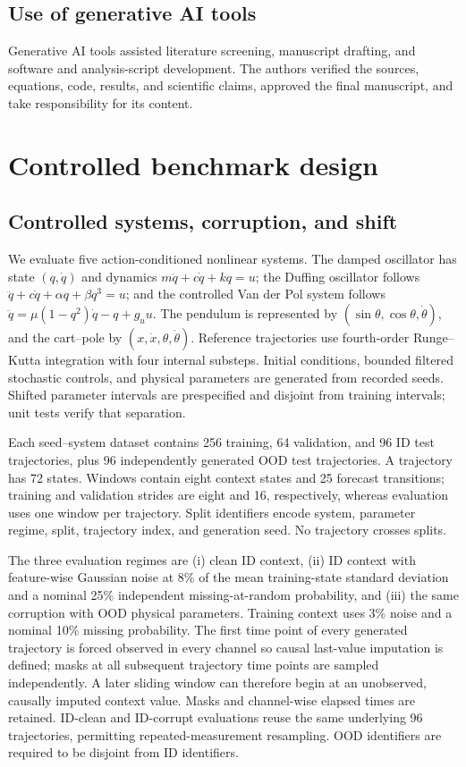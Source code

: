\documentclass[iicol,pdflatex,sn-basic,Numbered]{sn-jnl}
\begin{document}
\subsection{Use of generative AI tools}

Generative AI tools assisted literature screening, manuscript drafting, and
software and analysis-script development. The authors verified the sources,
equations, code, results, and scientific claims, approved the final manuscript,
and take responsibility for its content.

\section{Controlled benchmark design}

\subsection{Controlled systems, corruption, and shift}

We evaluate five action-conditioned nonlinear systems. The damped oscillator
has state $(q,\dot q)$ and dynamics $m\ddot q+c\dot q+kq=u$; the Duffing
oscillator follows $\ddot q+c\dot q+\alpha q+\beta q^3=u$; and the controlled
Van der Pol system follows
$\ddot q=\mu(1-q^2)\dot q-q+g_u u$. The pendulum is represented by
$(\sin\theta,\cos\theta,\dot\theta)$, and the cart--pole by
$(x,\dot x,\theta,\dot\theta)$. Reference trajectories use fourth-order
Runge--Kutta integration with four internal substeps. Initial conditions,
bounded filtered stochastic controls, and physical parameters are generated
from recorded seeds. Shifted parameter intervals are prespecified and disjoint
from training intervals; unit tests verify that separation.

Each seed--system dataset contains 256 training, 64 validation, and 96 ID test
trajectories, plus 96 independently generated OOD test trajectories. A
trajectory has 72 states. Windows contain eight context states and 25 forecast
transitions; training and validation strides are eight and 16, respectively,
whereas evaluation uses one window per trajectory. Split identifiers encode
system, parameter regime, split, trajectory index, and generation seed. No
trajectory crosses splits.

The three evaluation regimes are (i) clean ID context, (ii) ID context with
feature-wise Gaussian noise at 8\% of the mean training-state standard
deviation and a nominal 25\% independent missing-at-random probability, and
(iii) the same corruption with OOD physical parameters. Training context uses
3\% noise and a nominal 10\% missing probability. The first time point of every
generated trajectory is forced observed in every channel so causal last-value
imputation is defined; masks at all subsequent trajectory time points are
sampled independently. A later sliding window can therefore begin at an
unobserved, causally imputed context value. Masks and channel-wise elapsed times
are retained. ID-clean and ID-corrupt evaluations reuse the same underlying 96
trajectories, permitting repeated-measurement resampling. OOD identifiers are
required to be disjoint from ID identifiers.
\end{document}
